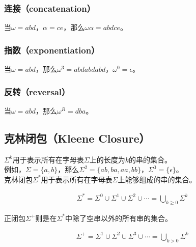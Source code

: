 \subsubsection{连接（concatenation）}

当$ \omega = abd $，$ \alpha = ce $，那么$ \omega\alpha = abdce $。\\

\subsubsection{指数（exponentiation）}

当$ \omega = abd $，那么$ \omega^3 = abdabdabd $，$ \omega^0 = \epsilon $。\\

\subsubsection{反转（reversal）}

当$ \omega = abd $，那么$ \omega^R = dba $。\\

\subsection{克林闭包（Kleene Closure）}

$ \Sigma^k $用于表示所有在字母表$ \Sigma $上的长度为$ k $的串的集合。\\

例如，$ \Sigma = \{a, b\} $，那么$ \Sigma^2 = \{ab, ba, aa, bb\} $，$ \Sigma^0 = \{\epsilon\} $。\\

克林闭包$ \Sigma^* $用于表示所有在字母表$ \Sigma $上能够组成的串的集合。\\

\vspace{-1cm}

\begin{align}
	\Sigma^* = \Sigma^0 \cup \Sigma^1 \cup \Sigma^2 \cup \cdots = \bigcup_{k \ge 0}\Sigma^k
\end{align}

正闭包$ \Sigma^+ $则是在$ \Sigma^* $中除了空串以外的所有串的集合。\\

\vspace{-1cm}

\begin{align}
	\Sigma^+ = \Sigma^1 \cup \Sigma^2 \cup \Sigma^3 \cup \cdots = \bigcup_{k > 0}\Sigma^k
\end{align}

